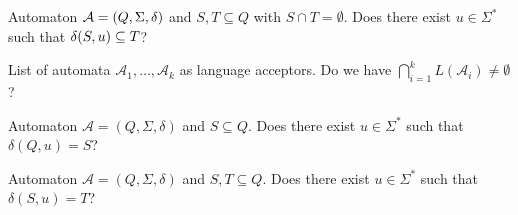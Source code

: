 \IN{\DST}
\decisionproblem{\DST}
{Automaton $\mathcal A = (Q, \Sigma, \delta)$ and $S, T \subseteq Q$ with $S \cap T = \emptyset$.}
{Does there exist $u \in \Sigma^*$ such that $\delta(S,u) \subseteq T$?}

\IN{\DFAINT}
{List of automata $\mathcal A_1, \ldots, \mathcal A_k$ as language acceptors.}
{Do we have $\bigcap_{i=1}^k L(\mathcal A_i) \ne \emptyset$?}

\IN{\REACH}
{Automaton $\mathcal A = (Q, \Sigma, \delta)$ and $S \subseteq Q$.}
{Does there exist $u \in \Sigma^*$ such that $\delta(Q, u) = S$?}

\IN{\REACHF}
{Automaton $\mathcal A = (Q, \Sigma, \delta)$ and $S,T \subseteq Q$.}
{Does there exist $u \in \Sigma^*$ such that $\delta(S, u) = T$?}